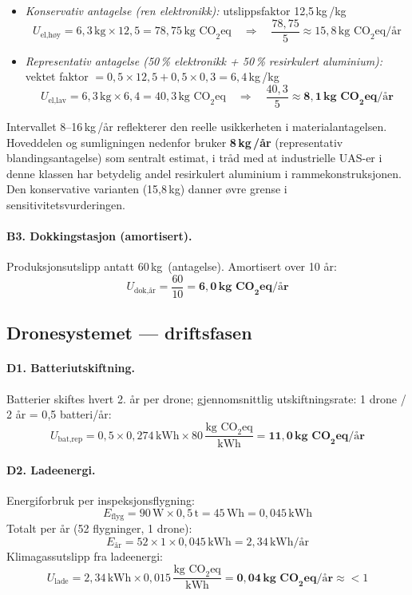 \begin{itemize}
    \item \textit{Konservativ antagelse (ren elektronikk):} utslippsfaktor 12{,}5\,kg\,/kg \parencite{lca_battery_2021}
    \[
        U_{\text{el,høy}} = 6{,}3\,\text{kg} \times 12{,}5 = 78{,}75\,\text{kg CO}_2\text{eq} \quad \Rightarrow \quad \frac{78{,}75}{5} \approx 15{,}8\,\text{kg CO}_2\text{eq/år}
    \]
    \item \textit{Representativ antagelse (50\,\% elektronikk + 50\,\% resirkulert aluminium):} vektet faktor $= 0{,}5 \times 12{,}5 + 0{,}5 \times 0{,}3 = 6{,}4$\,kg\,/kg
    \[
        U_{\text{el,lav}} = 6{,}3\,\text{kg} \times 6{,}4 = 40{,}3\,\text{kg CO}_2\text{eq} \quad \Rightarrow \quad \frac{40{,}3}{5} \approx \mathbf{8{,}1\,\text{kg CO}_2\text{eq/år}}
    \]
\end{itemize}

Intervallet 8--16\,kg\,/år reflekterer den reelle usikkerheten i materialantagelsen. Hoveddelen og sumligningen nedenfor bruker \textbf{8\,kg\,/år} (representativ blandingsantagelse) som sentralt estimat, i tråd med at industrielle UAS-er i denne klassen har betydelig andel resirkulert aluminium i rammekonstruksjonen. Den konservative varianten (15,8\,kg) danner øvre grense i sensitivitetsvurderingen.

\paragraph{B3. Dokkingstasjon (amortisert).}
Produksjonsutslipp antatt 60\,kg\, (antagelse). Amortisert over 10 år:
\[
    U_{\text{dok,år}} = \frac{60}{10} = \mathbf{6{,}0\,\text{kg CO}_2\text{eq/år}}
\]

\subsection{Dronesystemet — driftsfasen}

\paragraph{D1. Batteriutskiftning.}
Batterier skiftes hvert 2. år per drone; gjennomsnittlig utskiftningsrate: 1 drone / 2 år = 0{,}5 batteri/år:
\[
    U_{\text{bat,rep}} = 0{,}5 \times 0{,}274\,\text{kWh} \times 80\,\frac{\text{kg CO}_2\text{eq}}{\text{kWh}} = \mathbf{11{,}0\,\text{kg CO}_2\text{eq/år}}
\]

\paragraph{D2. Ladeenergi.}
Energiforbruk per inspeksjonsflygning:
\[
    E_{\text{flyg}} = 90\,\text{W} \times 0{,}5\,\text{t} = 45\,\text{Wh} = 0{,}045\,\text{kWh}
\]
Totalt per år (52 flygninger, 1 drone):
\[
    E_{\text{år}} = 52 \times 1 \times 0{,}045\,\text{kWh} = 2{,}34\,\text{kWh/år}
\]
Klimagassutslipp fra ladeenergi:
\[
    U_{\text{lade}} = 2{,}34\,\text{kWh} \times 0{,}015\,\frac{\text{kg CO}_2\text{eq}}{\text{kWh}} = \mathbf{0{,}04\,\text{kg CO}_2\text{eq/år}} \approx <1
\]

